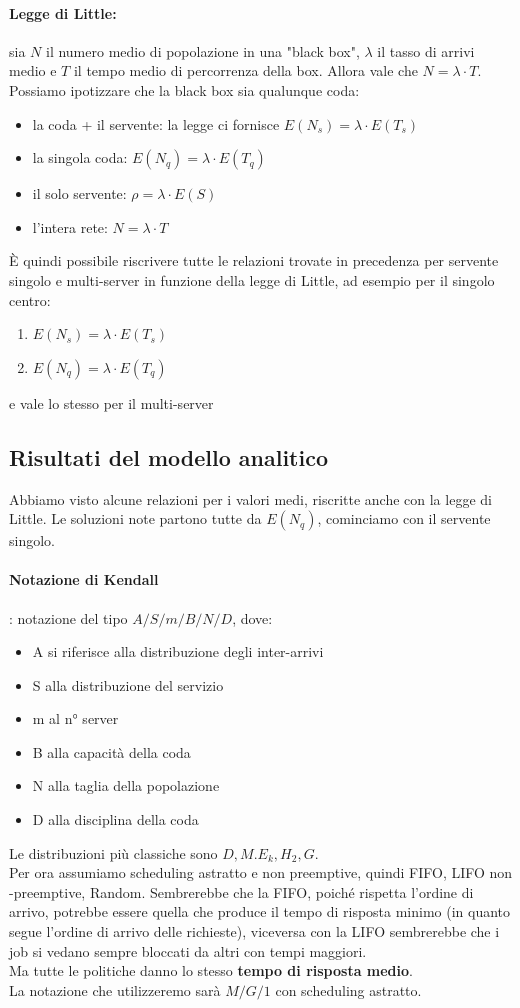 \documentclass{article}
\begin{document}
\paragraph{Legge di Little:}sia $N$ il numero medio di popolazione in una "black box", $\lambda$ il tasso di arrivi medio e $T$ il tempo medio di percorrenza della box. Allora vale che $N = \lambda\cdot T$.\\ Possiamo ipotizzare che la black box sia qualunque coda:
\begin{itemize}
\item la coda + il servente: la legge ci fornisce $E(N_s) = \lambda\cdot E(T_s)$
\item la singola coda: $E(N_q) = \lambda\cdot E(T_q)$
\item il solo servente: $\rho = \lambda\cdot E(S)$
\item l'intera rete: $N = \lambda\cdot T$
\end{itemize}
È quindi possibile riscrivere tutte le relazioni trovate in precedenza per servente singolo e multi-server in funzione della legge di Little, ad esempio per il singolo centro:
\begin{enumerate}
\item $E(N_s) = \lambda\cdot E(T_s)$
\item $E(N_q) = \lambda\cdot E(T_q)$
\end{enumerate}
e vale lo stesso per il multi-server\\
\subsection{Risultati del modello analitico}
Abbiamo visto alcune relazioni per i valori medi, riscritte anche con la legge di Little. Le soluzioni note partono tutte da $E(N_q)$, cominciamo con il servente singolo.
\paragraph{Notazione di Kendall}: notazione del tipo $A/S/m/B/N/D$, dove:
\begin{itemize}
\item A si riferisce alla distribuzione degli inter-arrivi
\item S alla distribuzione del servizio
\item m al n° server
\item B alla capacità della coda
\item N alla taglia della popolazione
\item D alla disciplina della coda
\end{itemize}
Le distribuzioni più classiche sono $D, M. E_k, H_2, G$. \\ Per ora assumiamo scheduling astratto e non preemptive, quindi FIFO, LIFO non -preemptive, Random. Sembrerebbe che la FIFO, poiché rispetta l'ordine di arrivo, potrebbe essere quella che produce il tempo di risposta minimo (in quanto segue l'ordine di arrivo delle richieste), viceversa con la LIFO sembrerebbe che i job si vedano sempre bloccati da altri con tempi maggiori.\\ Ma tutte le politiche danno lo stesso \textbf{tempo di risposta medio}.\\ La notazione che utilizzeremo sarà $M/G/1$ con scheduling astratto.
\end{document}
